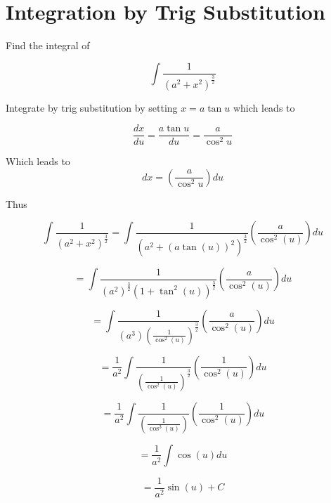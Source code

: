 \documentclass[14pt]{memoir}
\begin{document}
\appendix

\chapter{Integration by Trig Substitution}
\label{sec:trigsub}

Find the integral of 

\begin{equation}
\int \frac{1}{(a^2 + x^2)^{\frac{3}{2}}}
\end{equation}

Integrate by trig substitution by setting $x = a\tan{u}$ which leads to 

\begin{equation}
\frac{dx}{du} = \frac{a \tan{u}}{du} = \frac{a}{\cos^2{u}}
\end{equation}

Which leads to 
\begin{equation}
dx = ( \frac{a}{\cos^2{u}}) du 
\end{equation}

Thus

\begin{equation}
\int \frac{1}{(a^2 + x^2)^{\frac{3}{2}}} =  \int \frac{1}{(a^2 + (a\tan{(u)})^2)^{\frac{3}{2}}} ( \frac{a}{\cos^2{(u)}}) du
\end{equation}

\begin{equation}
=  \int \frac{1}{(a^2)^{\frac{3}{2}} (1 + \tan^2{(u)})^{\frac{3}{2}}} ( \frac{a}{\cos^2{(u)}}) du
\end{equation}

\begin{equation}
=  \int \frac{1}{(a^3)(\frac{1}{\cos^2(u)})^{\frac{3}{2}}} ( \frac{a}{\cos^2{(u)}}) du
\end{equation}

\begin{equation}
=  \frac{1}{a^2} \int \frac{1}{(\frac{1}{\cos^2(u)})^{\frac{3}{2}}} ( \frac{1}{\cos^2{(u)}}) du
\end{equation}

\begin{equation}
=  \frac{1}{a^2} \int \frac{1}{(\frac{1}{\cos^3(u)})} ( \frac{1}{\cos^2{(u)}}) du
\end{equation}

\begin{equation}
=  \frac{1}{a^2} \int \cos{(u)} du
\end{equation}

\begin{equation}
=  \frac{1}{a^2} \sin{(u)} + C
\end{equation}
\end{document}
